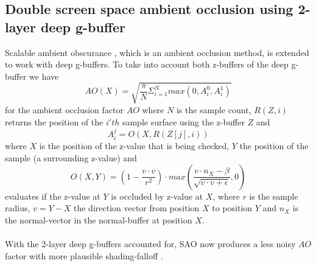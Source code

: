 \documentclass{ACGSeminar}
\begin{document}
	\subsection{Double screen space ambient occlusion using 2-layer deep g-buffer}
		Scalable ambient obscurance \cite{SAO}, which is an ambient occlusion method, is extended to work with deep g-buffers. To take into account both z-buffers of the deep g-buffer we have
		$$ AO(X) = \sqrt{\frac{\pi}{N} \Sigma_{i=1}^{N} max(0, A_{i}^{0}, A_{i}^{1})} $$
		for the ambient occlusion factor $AO$ where $N$ is the sample count, $R(Z, i)$ returns the position of the $i'th$ sample surface using the z-buffer $Z$ and
		$$ A_{i}^{j} = O(X, R(Z[j], i))$$
		where $X$ is the position of the z-value that is being checked, $Y$ the position of the sample (a surrounding z-value) and
		$$ O(X, Y) = (1 - \frac{v \cdot v}{r^2}) \cdot max(\frac{v \cdot n_X - \beta}{\sqrt{v \cdot v + \epsilon}}, 0) $$
		evaluates if the z-value at $Y$ is occluded by z-value at $X$, where $r$ is the sample radius, $v = Y - X$ the direction vector from position $X$ to position $Y$ and $n_X$ is the normal-vector in the normal-buffer at position $X$. \\\\
		With the 2-layer deep g-buffers accounted for, SAO now produces a less noisy $AO$ factor with more plausible shading-falloff \cite{Mara2016DeepGBuffer}. 
		
\end{document}
